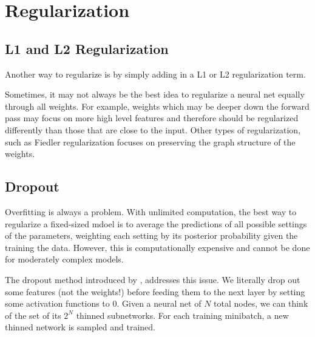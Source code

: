 \section{Regularization}

\subsection{L1 and L2 Regularization}

  Another way to regularize is by simply adding in a L1 or L2 regularization term. 

  Sometimes, it may not always be the best idea to regularize a neural net equally through all weights. For example, weights which may be deeper down the forward pass may focus on more high level features and therefore should be regularized differently than those that are close to the input. Other types of regularization, such as Fiedler regularization \cite{fiedler} focuses on preserving the graph structure of the weights. 

\subsection{Dropout}

  Overfitting is always a problem. With unlimited computation, the best way to regularize a fixed-sized mdoel is to average the predictions of all possible settings of the parameters, weighting each setting by its posterior probability given the training the data. However, this is computationally expensive and cannot be done for moderately complex models. 

  The dropout method introduced by \cite{dropout}, addresses this issue. We literally drop out some features (not the weights!) before feeding them to the next layer by setting some activation functions to $0$. Given a neural net of $N$ total nodes, we can think of the set of its $2^N$ thinned subnetworks. For each training minibatch, a new thinned network is sampled and trained. 

